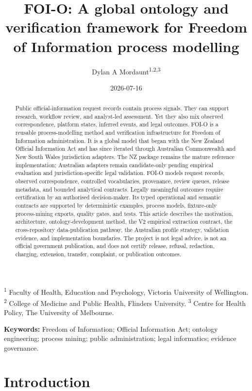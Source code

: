 \documentclass[
]{article}
\title{FOI-O: A global ontology and verification framework for Freedom
of Information process modelling}
\author{Dylan A Mordaunt\textsuperscript{1,2,3}}
\date{2026-07-16}
\begin{document}
\maketitle
\begin{abstract}
Public official-information request records contain process signals.
They can support research, workflow review, and analyst-led assessment.
Yet they also mix observed correspondence, platform states, inferred
events, and legal outcomes. FOI-O is a reusable process-modelling method
and verification infrastructure for Freedom of Information
administration. It is a global model that began with the New Zealand
Official Information Act and has since iterated through Australian
Commonwealth and New South Wales jurisdiction adapters. The NZ package
remains the mature reference implementation; Australian adapters remain
candidate-only pending empirical evaluation and jurisdiction-specific
legal validation. FOI-O models request records, observed correspondence,
controlled vocabularies, provenance, review queues, release metadata,
and bounded analytical contracts. Legally meaningful outcomes require
certification by an authorised decision-maker. Its typed operational and
semantic contracts are supported by deterministic examples, process
models, fixture-only process-mining exports, quality gates, and tests.
This article describes the motivation, architecture,
ontology-development method, the V2 empirical extraction contract, the
cross-repository data-publication pathway, the Australian profile
strategy, validation evidence, and implementation boundaries. The
project is not legal advice, is not an official government publication,
and does not certify release, refusal, redaction, charging, extension,
transfer, complaint, or publication outcomes.
\end{abstract}

\textsuperscript{1} Faculty of Health, Education and Psychology,
Victoria University of Wellington. \textsuperscript{2} College of
Medicine and Public Health, Flinders University. \textsuperscript{3}
Centre for Health Policy, The University of Melbourne.

\textbf{Keywords:} Freedom of Information; Official Information Act;
ontology engineering; process mining; public administration; legal
informatics; evidence governance.

\section{Introduction}\label{introduction}
\end{document}
